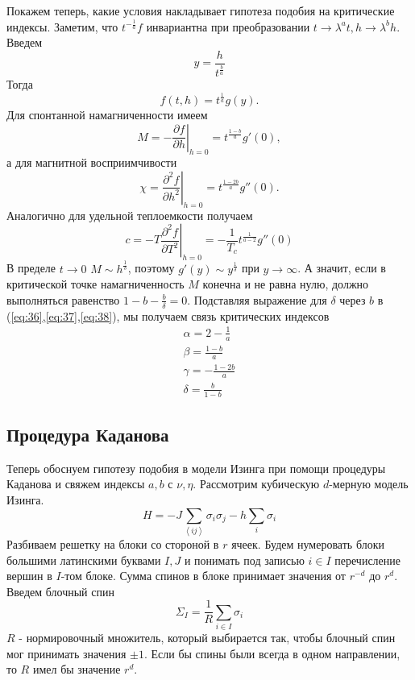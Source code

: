 \documentclass[a4paper,12pt]{article}
\theoremstyle{definition}
\theoremstyle{definition}
\theoremstyle{definition}
\begin{document}
Покажем теперь, какие условия накладывает гипотеза подобия на критические индексы. Заметим, что $t^{-\frac{1}{a}}f$ инвариантна при преобразовании $t\to \lambda^a t, h\to \lambda^b h$. Введем
\begin{equation}
  \label{eq:34}
  y=\frac{h}{t^{\frac{b}{a}}}
\end{equation}
Тогда
\begin{equation}
  \label{eq:35}
  f(t,h)=t^{\frac{1}{a}}g(y).
\end{equation}
Для спонтанной намагниченности имеем
\begin{equation}
  \label{eq:36}
  M=-\left.\frac{\partial f}{\partial h}\right|_{h=0}=t^{\frac{1-b}{a}}g'(0),
\end{equation}
а для  магнитной восприимчивости
\begin{equation}
  \label{eq:37}
  \chi=\left.\frac{\partial^2 f}{\partial h^2}\right|_{h=0}=t^{\frac{1-2b}{a}}g''(0).
\end{equation}
Аналогично для удельной теплоемкости получаем
\begin{equation}
  \label{eq:38}
  c=-T\left.\frac{\partial^2 f}{\partial T^2}\right|_{h=0}=-\frac{1}{T_c}t^{\frac{1}{a-2}}g''(0)
\end{equation}
В пределе $t\to 0$ $M\sim h^{\frac{1}{\delta}}$, поэтому $g'(y)\sim y^{\frac{1}{\delta}}$ при $y\to \infty$. А значит, если в критической точке намагниченность $M$ конечна и не равна нулю, должно выполняться равенство $1-b-\frac{b}{\delta}=0$. Подставляя выражение для $\delta$ через $b$ в (\ref{eq:36},\ref{eq:37},\ref{eq:38}), мы получаем связь критических индексов
  \begin{eqnarray}
    \label{eq:39}
    \alpha=2-\frac{1}{a}\\
    \beta=\frac{1-b}{a}\\
    \gamma=-\frac{1-2b}{a}\\
    \delta=\frac{b}{1-b}
  \end{eqnarray}
\subsection{Процедура Каданова}
\label{sec:kadanoff-procedure}
Теперь обоснуем гипотезу подобия в модели Изинга при помощи процедуры Каданова и свяжем индексы $a,b$ с $\nu,\eta$.
Рассмотрим кубическую $d$-мерную модель Изинга.
\begin{equation}
  \label{eq:40}
  H=-J\sum_{\left<ij\right>}\sigma_i \sigma_j-h\sum_i \sigma_i
\end{equation}
Разбиваем решетку на блоки со стороной в $r$ ячеек. Будем нумеровать блоки большими латинскими буквами $I,J$ и понимать под записью $i\in I$ перечисление вершин в $I$-том блоке.
Сумма спинов в блоке принимает значения от $r^{-d}$ до $r^d$. Введем блочный спин
\begin{equation}
  \label{eq:41}
  \Sigma_I=\frac{1}{R}\sum_{i\in I}\sigma_i
\end{equation}
$R$ - нормировочный множитель, который выбирается так, чтобы блочный спин мог принимать значения $\pm 1$. Если бы спины были всегда в одном направлении, то $R$ имел бы значение $r^d$. 
\end{document}
